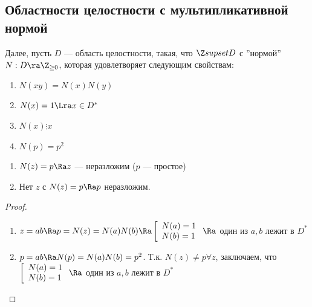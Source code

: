 
\subsection{Областности целостности с мультипликативной нормой}

Далее, пусть \(D\) --- область целостности, такая, что \(\Z supset D\) с ''нормой'' \(N: D \ra \Z_{\ge 0}\), которая удовлетворяет следующим свойствам:
\begin{enumerate}
    \item \(N(xy) = N(x)N(y)\)
    \item \(N(x) = 1 \Lra x \in D^*\)
    \item \(N(x) \vdots x\)
    \item \(N(p) = p^2\)
\end{enumerate}

\begin{proposition}
    \begin{enumerate}
        \item \(N(z) = p \Ra z\) --- неразложим (\(p\) --- простое)
        \item Нет \(z\) с \(N(z) = p \Ra p\) неразложим.
    \end{enumerate}
\end{proposition}
\begin{proof}
    \begin{enumerate}
        \item \(z = ab \Ra p = N(z) = N(a)N(b) \Ra \left[\begin{array}{l}
            N(a) = 1 \\
            N(b) = 1
        \end{array}\right. \Ra\) один из \(a, b\) лежит в \(D^*\)
        \item \(p = ab \Ra N(p) = N(a)N(b) = p^2\). Т.к. \(N(z) \ne p \forall z\), заключаем, что  \(\left[\begin{array}{l}
            N(a) = 1 \\
            N(b) = 1
        \end{array}\right. \Ra\) один из \(a, b\) лежит в \(D^*\)
    \end{enumerate}
\end{proof}

